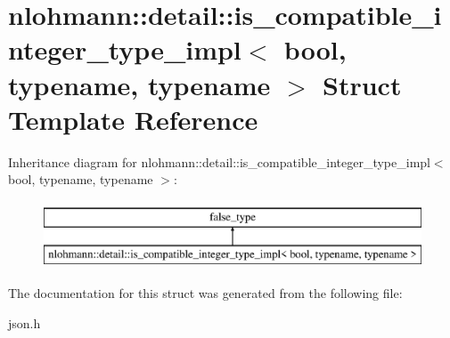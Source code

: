 \hypertarget{structnlohmann_1_1detail_1_1is__compatible__integer__type__impl}{}\section{nlohmann\+:\+:detail\+:\+:is\+\_\+compatible\+\_\+integer\+\_\+type\+\_\+impl$<$ bool, typename, typename $>$ Struct Template Reference}
\label{structnlohmann_1_1detail_1_1is__compatible__integer__type__impl}
Inheritance diagram for nlohmann\+:\+:detail\+:\+:is\+\_\+compatible\+\_\+integer\+\_\+type\+\_\+impl$<$ bool, typename, typename $>$\+:\begin{figure}[H]
\begin{center}
\leavevmode
\includegraphics[height=2.000000cm]{structnlohmann_1_1detail_1_1is__compatible__integer__type__impl}
\end{center}
\end{figure}


The documentation for this struct was generated from the following file\+:\begin{DoxyCompactItemize}
\item 
json.\+h\end{DoxyCompactItemize}
